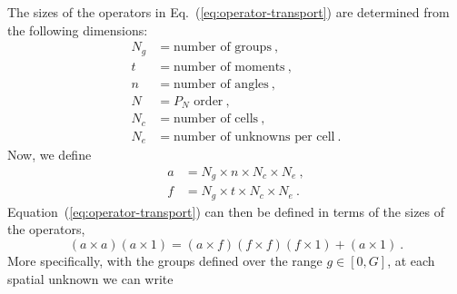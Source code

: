 \documentclass{article}
\numberwithin{equation}{subsection}
\begin{document}
The sizes of the operators in Eq.~(\ref{eq:operator-transport}) are determined
from the following dimensions:
\begin{equation}
  \begin{aligned}
    N_g &= \text{number of groups}\:,\\
    t   &= \text{number of moments}\:,\\
    n   &= \text{number of angles}\:,\\
    N   &= \text{$P_N$ order}\:,\\
    N_c &= \text{number of cells}\:,\\
    N_e &= \text{number of unknowns per cell}\:.
  \end{aligned}
\end{equation}
Now, we define
\begin{align}
  a &= N_g\times n\times N_c\times N_e\:,\\
  f &= N_g\times t\times N_c\times N_e\:.
\end{align}
Equation~(\ref{eq:operator-transport}) can then be defined in terms of
the sizes of the operators,
\begin{equation}
  (a\times a)(a\times 1) = (a\times f)(f\times f)(f\times 1) +
  (a\times 1)\:.
  \label{eq:operator-sizes}
\end{equation}
More specifically, with the groups defined over the range $g\in[0,G]$,
at each spatial unknown we can write
\end{document}
